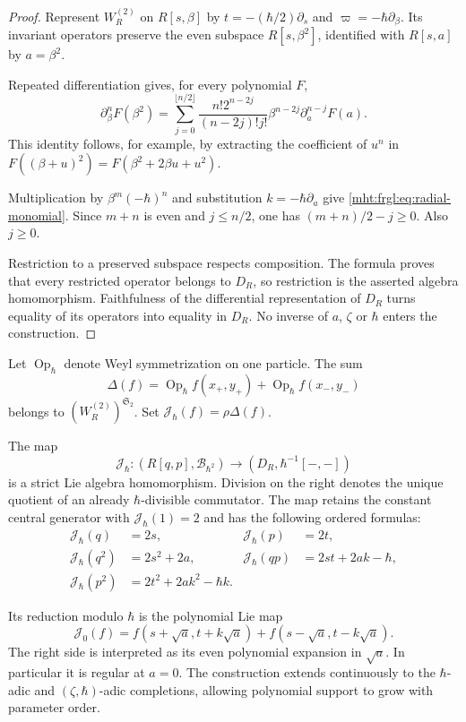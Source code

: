 \begin{proof}
Represent $W_R^{(2)}$ on $R[s,\beta]$ by
$t=-(\hbar/2)\partial_s$ and $\varpi=-\hbar\partial_\beta$.
Its invariant operators preserve the even subspace
$R[s,\beta^2]$, identified with $R[s,a]$ by $a=\beta^2$.

Repeated differentiation gives, for every polynomial $F$,
\[
 \partial_\beta^n F(\beta^2)=
 \sum_{j=0}^{\lfloor n/2\rfloor}
 \frac{n!2^{n-2j}}{(n-2j)!j!}
 \beta^{n-2j}\partial_a^{n-j}F(a).
\]
This identity follows, for example, by extracting the coefficient
of $u^n$ in $F((\beta+u)^2)=F(\beta^2+2\beta u+u^2)$.

Multiplication by $\beta^m(-\hbar)^n$ and substitution
$k=-\hbar\partial_a$ give \eqref{mht:frgl:eq:radial-monomial}.
Since $m+n$ is even and $j\leq n/2$, one has
$(m+n)/2-j\geq0$.  Also $j\geq0$.

Restriction to a preserved subspace respects composition.
The formula proves that every restricted operator belongs to
$D_R$, so restriction is the asserted algebra homomorphism.
Faithfulness of the differential representation of $D_R$
turns equality of its operators into equality in $D_R$.
No inverse of $a$, $\zeta$ or $\hbar$ enters the construction.
\end{proof}

Let $\operatorname{Op}_\hbar$ denote Weyl symmetrization on one
particle.  The sum
\[
 \Delta(f)=\operatorname{Op}_\hbar f(x_+,y_+)
             +\operatorname{Op}_\hbar f(x_-,y_-)
\]
belongs to $(W_R^{(2)})^{\mathfrak S_2}$.  Set
$\mathcal J_\hbar(f)=\rho\Delta(f)$.

\begin{theorem}
\label{mht:frgl:thm:regular-local-quantum}
The map
\[
 \mathcal J_\hbar:
 (R[q,p],\mathcal B_{\hbar^2})\longrightarrow
 (D_R,\hbar^{-1}[-,-])
\]
is a strict Lie algebra homomorphism.  Division on the right
denotes the unique quotient of an already $\hbar$-divisible
commutator.  The map retains the constant central generator with
$\mathcal J_\hbar(1)=2$ and has the following ordered formulas:
\begin{align*}
 \mathcal J_\hbar(q)&=2s,&
 \mathcal J_\hbar(p)&=2t,\\
 \mathcal J_\hbar(q^2)&=2s^2+2a,&
 \mathcal J_\hbar(qp)&=2st+2ak-\hbar,\\
 \mathcal J_\hbar(p^2)&=2t^2+2ak^2-\hbar k.
\end{align*}

Its reduction modulo $\hbar$ is the polynomial Lie map
\begin{equation}\label{mht:frgl:eq:quantum-classical-radial}
 \mathcal J_0(f)=
 f(s+\sqrt a,t+k\sqrt a)+
 f(s-\sqrt a,t-k\sqrt a).
\end{equation}
The right side is interpreted as its even polynomial expansion
in $\sqrt a$.  In particular it is regular at $a=0$.
The construction extends continuously to the $\hbar$-adic and
$(\zeta,\hbar)$-adic completions, allowing polynomial support
to grow with parameter order.
\end{theorem}

